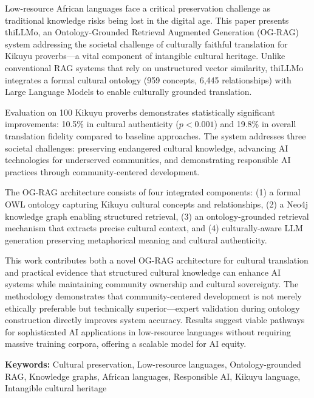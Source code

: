 \documentclass[11pt,a4paper]{article}
\begin{document}
Low-resource African languages face a critical preservation challenge as traditional knowledge risks being lost in the digital age. This paper presents thiLLMo, an Ontology-Grounded Retrieval Augmented Generation (OG-RAG) system addressing the societal challenge of culturally faithful translation for Kikuyu proverbs---a vital component of intangible cultural heritage. Unlike conventional RAG systems that rely on unstructured vector similarity, thiLLMo integrates a formal cultural ontology (959 concepts, 6,445 relationships) with Large Language Models to enable culturally grounded translation.

Evaluation on 100 Kikuyu proverbs demonstrates statistically significant improvements: 10.5\% in cultural authenticity ($p < 0.001$) and 19.8\% in overall translation fidelity compared to baseline approaches. The system addresses three societal challenges: preserving endangered cultural knowledge, advancing AI technologies for underserved communities, and demonstrating responsible AI practices through community-centered development.

The OG-RAG architecture consists of four integrated components: (1) a formal OWL ontology capturing Kikuyu cultural concepts and relationships, (2) a Neo4j knowledge graph enabling structured retrieval, (3) an ontology-grounded retrieval mechanism that extracts precise cultural context, and (4) culturally-aware LLM generation preserving metaphorical meaning and cultural authenticity.

This work contributes both a novel OG-RAG architecture for cultural translation and practical evidence that structured cultural knowledge can enhance AI systems while maintaining community ownership and cultural sovereignty. The methodology demonstrates that community-centered development is not merely ethically preferable but technically superior---expert validation during ontology construction directly improves system accuracy. Results suggest viable pathways for sophisticated AI applications in low-resource languages without requiring massive training corpora, offering a scalable model for AI equity.

\vspace{5pt}

\noindent\textbf{Keywords:} Cultural preservation, Low-resource languages, Ontology-grounded RAG, Knowledge graphs, African languages, Responsible AI, Kikuyu language, Intangible cultural heritage

\vspace{10pt}
\end{document}
